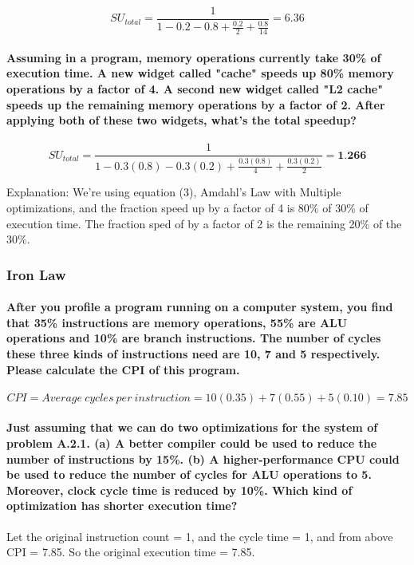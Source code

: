 \documentclass{article}
\begin{document}
$$
SU_{total} = \frac{1}{1-0.2-0.8 + \frac{0.2}{2} + \frac{0.8}{14}} = 6.36
$$


\paragraph{Assuming in a program, memory operations currently take 30\% of execution time. A new widget called
"cache" speeds up 80\% memory operations by a factor of 4. A second new widget called "L2 cache"
speeds up the remaining memory operations by a factor of 2. After applying both of these two widgets,
what's the total speedup?}


$$
SU_{total} = \frac{1}{1 - 0.3(0.8) - 0.3(0.2) + \frac{0.3(0.8)}{4} + \frac{0.3(0.2)}{2}} = \textbf{1.266}
$$

Explanation: We're using equation (3), Amdahl's Law with Multiple optimizations, and the fraction speed up by a factor of 4 is 80\% of 30\% of execution time. The fraction sped of by a factor of 2 is the remaining 20\% of the 30\%.

\subsubsection{Iron Law}

\paragraph{After you profile a program running on a computer system, you find that 35\% instructions are memory
operations, 55\% are ALU operations and 10\% are branch instructions. The number of cycles these three
kinds of instructions need are 10, 7 and 5 respectively. Please calculate the CPI of this program.}


$$
CPI = Average\ cycles\ per\ instruction = 10(0.35) + 7(0.55) + 5(0.10) = 7.85
$$

\paragraph{ Just assuming that we can do two optimizations for the system of problem A.2.1. (a) A better compiler could be used to reduce the number of instructions by 15\%. (b) A higher-performance CPU could be used to reduce the number of cycles for ALU operations to 5.
Moreover, clock cycle time is reduced by 10\%. Which kind of optimization has shorter execution time?}

Let the original instruction count = 1, and the cycle time = 1, and from above CPI = 7.85. So the original execution time = 7.85.
\end{document}
